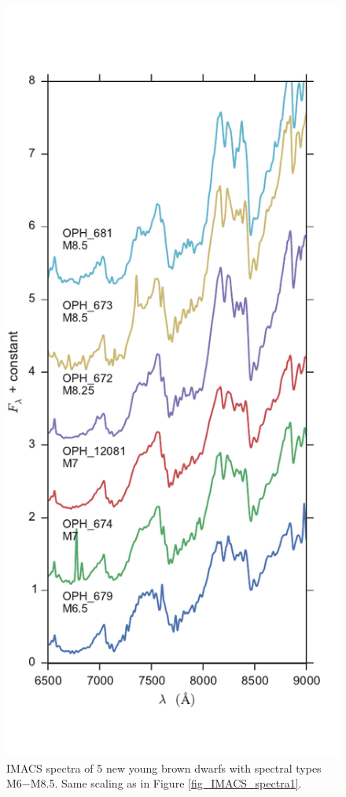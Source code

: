 \documentclass[12pt,preprint]{aastex}
\begin{document}
\begin{figure}[ht!]
\caption{IMACS spectra of 5 new young brown dwarfs with spectral types M6$-$M8.5.  Same scaling as in Figure \ref{fig_IMACS_spectra1}. \label{fig_IMACS_spectra2} }
\centering
\includegraphics[scale=0.65]{figures/IMACS_spectra_M6_M8p5}
\end{figure}
\end{document}

